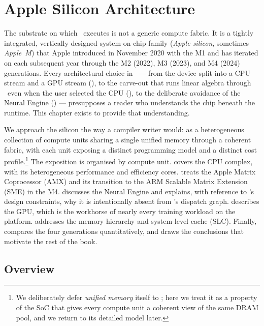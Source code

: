 \chapter{Apple Silicon Architecture}
\label{ch:apple_silicon}

The substrate on which \Lucid\ executes is not a generic compute fabric.
It is a tightly integrated, vertically designed system-on-chip family
(\emph{Apple silicon}, sometimes \emph{Apple~M}) that Apple introduced in
November 2020 with the M1 and has iterated on each subsequent year through
the M2 (2022), M3 (2023), and M4 (2024) generations. Every architectural
choice in \Lucid\ --- from the device split into a CPU stream and a GPU
stream (), to the carve-out that runs linear
algebra through \MLX\ even when the user selected the CPU
(), to the deliberate avoidance of the Neural Engine
() --- presupposes a reader who understands
the chip beneath the runtime. This chapter exists to provide that
understanding.

We approach the silicon the way a compiler writer would: as a
heterogeneous collection of compute units sharing a single unified memory
through a coherent fabric, with each unit exposing a distinct programming
model and a distinct cost profile.\footnote{We deliberately defer
\emph{unified memory} itself to ; here we treat
it as a property of the SoC that gives every compute unit a coherent view
of the same DRAM pool, and we return to its detailed model later.} The
exposition is organised by compute unit. 
covers the CPU complex, with its heterogeneous performance and efficiency
cores.  treats the Apple Matrix Coprocessor
(AMX) and its transition to the ARM Scalable Matrix Extension (SME) in
the M4.  discusses the Neural Engine and
explains, with reference to \Lucid's design constraints, why it is
intentionally absent from \Lucid's dispatch graph.
 describes the GPU, which is the workhorse
of nearly every training workload on the platform.
 addresses the memory hierarchy and
system-level cache (SLC). Finally,
 compares the four generations
quantitatively, and  draws the
conclusions that motivate the rest of the book.

\section{Overview}
\label{sec:apple_silicon:overview}


